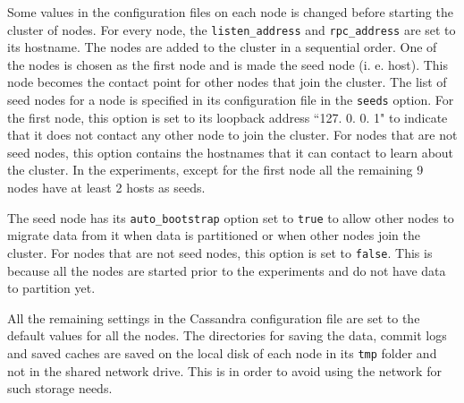 
% 			

Some values in the configuration files on each node is changed before starting
the cluster of nodes.  For every node,  the \texttt{listen\_address} and
\texttt{rpc\_address} are set to its  hostname.  The nodes are added to the
cluster in a sequential order.  One of the nodes is chosen as the first node and
is made the seed node (i. e.  host).  This node becomes the contact point for other
nodes that join the cluster.  The list of seed nodes for a node is specified in
its configuration file in the \texttt{seeds} option.  For the first node,  this
option is set to its loopback address ``127. 0. 0. 1" to indicate that it does not
contact any other node to join the cluster.  For nodes that are not seed nodes, 
this option contains the hostnames that it can contact to learn about the
cluster.  In the experiments,  except for the first node all
the remaining 9 nodes have at least 2 hosts as seeds. 

The seed node has its \texttt{auto\_bootstrap} option set to \texttt{true} to
allow other nodes to migrate data from it when data is partitioned or when other
nodes join the cluster.  For nodes that are not seed nodes,  this option is set
to \texttt{false}.  This is because all the nodes are started prior to the 
experiments and do not have data to partition yet. 
 
All the remaining
settings in the Cassandra configuration file are set to the  default values
for all the nodes.  The directories for saving the data,  commit logs and saved
caches are saved on the local disk of each node in its \texttt{tmp} folder and
not in the shared network drive.  This is in order to avoid using the network
for such storage needs. 


